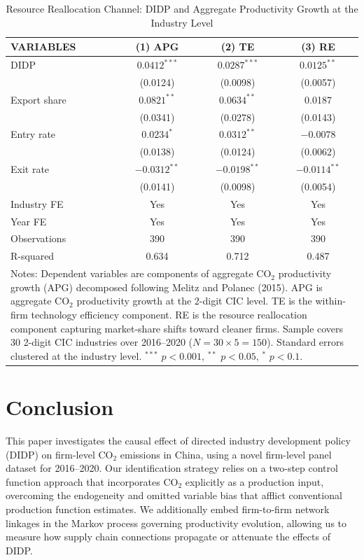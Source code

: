 \documentclass[11pt,a4paper]{article}
\begin{document}
\begin{table}[htbp]
\centering
\caption{Resource Reallocation Channel: DIDP and Aggregate Productivity Growth at the Industry Level}
\label{tab:reallocation}
\begin{tabular}{lccc}
\toprule
VARIABLES    & (1) APG & (2) TE & (3) RE \\
\midrule
DIDP         & $0.0412^{***}$ & $0.0287^{***}$ & $0.0125^{**}$ \\
             & (0.0124) & (0.0098) & (0.0057) \\
Export share & $0.0821^{**}$ & $0.0634^{**}$ & 0.0187 \\
             & (0.0341) & (0.0278) & (0.0143) \\
Entry rate   & $0.0234^{*}$ & $0.0312^{**}$ & $-0.0078$ \\
             & (0.0138) & (0.0124) & (0.0062) \\
Exit rate    & $-0.0312^{**}$ & $-0.0198^{**}$ & $-0.0114^{**}$ \\
             & (0.0141) & (0.0098) & (0.0054) \\
Industry FE  & Yes & Yes & Yes \\
Year FE      & Yes & Yes & Yes \\
Observations & 390 & 390 & 390 \\
R-squared    & 0.634 & 0.712 & 0.487 \\
\bottomrule
\multicolumn{4}{p{0.75\textwidth}}{\footnotesize Notes: Dependent variables are components of aggregate CO$_2$ productivity growth (APG) decomposed following Melitz and Polanec (2015). APG is aggregate CO$_2$ productivity growth at the 2-digit CIC level. TE is the within-firm technology efficiency component. RE is the resource reallocation component capturing market-share shifts toward cleaner firms. Sample covers 30 2-digit CIC industries over 2016--2020 ($N = 30 \times 5 = 150$). Standard errors clustered at the industry level. $^{***}$ $p<0.001$, $^{**}$ $p<0.05$, $^{*}$ $p<0.1$.}
\end{tabular}
\end{table}

\section{Conclusion}

This paper investigates the causal effect of directed industry development policy (DIDP) on firm-level CO$_2$ emissions in China, using a novel firm-level panel dataset for 2016--2020. Our identification strategy relies on a two-step control function approach that incorporates CO$_2$ explicitly as a production input, overcoming the endogeneity and omitted variable bias that afflict conventional production function estimates. We additionally embed firm-to-firm network linkages in the Markov process governing productivity evolution, allowing us to measure how supply chain connections propagate or attenuate the effects of DIDP.
\end{document}
